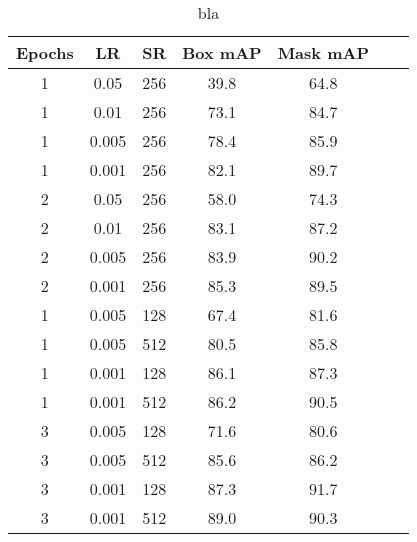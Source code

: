 \begin{table}
	\centering
	\caption[Detection evaluation]{bla}
	\label{tab:detection_eval}
	\begin{tabular}[htb]{ccccccc}
		\toprule
		\textbf{Epochs} & \textbf{LR} & \textbf{SR} & \textbf{Box mAP} & \textbf{Mask mAP} \\
		\midrule
		1               & 0.05        & 256         & 39.8             & 64.8              \\
		1               & 0.01        & 256         & 73.1             & 84.7              \\
		1               & 0.005       & 256         & 78.4             & 85.9              \\
		1               & 0.001       & 256         & 82.1             & 89.7              \\
		2               & 0.05        & 256         & 58.0             & 74.3              \\
		2               & 0.01        & 256         & 83.1             & 87.2              \\
		2               & 0.005       & 256         & 83.9             & 90.2              \\
		2               & 0.001       & 256         & 85.3             & 89.5              \\
		\midrule
		1               & 0.005       & 128         & 67.4             & 81.6              \\
		1               & 0.005       & 512         & 80.5             & 85.8              \\
		1               & 0.001       & 128         & 86.1             & 87.3              \\
		1               & 0.001       & 512         & 86.2             & 90.5              \\
		3               & 0.005       & 128         & 71.6             & 80.6              \\
		3               & 0.005       & 512         & 85.6             & 86.2              \\
		3               & 0.001       & 128         & 87.3             & 91.7              \\
		3               & 0.001       & 512         & 89.0             & 90.3              \\
		\bottomrule
	\end{tabular}
\end{table}


